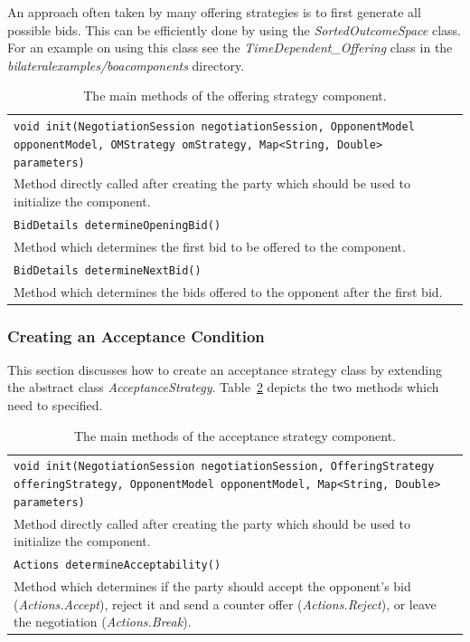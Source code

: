 \documentclass[]{article}
\begin{document}
An approach often taken by many offering strategies is to first generate all possible bids. This can be efficiently done by using the \textit{SortedOutcomeSpace} class. For an example on using this class see the \textit{TimeDependent\_Offering} class in the \textit{bilateralexamples/boacomponents} directory.

\begin{table}[h]
\begin{tabular}{m{}}
\hline
\texttt{void init(NegotiationSession negotiationSession, OpponentModel opponentModel, 
	OMStrategy omStrategy, Map<String, Double> parameters)}\\
Method directly called after creating the party which should be used to initialize the component.\\
\hline
\texttt{BidDetails determineOpeningBid()}\\
Method which determines the first bid to be offered to the component.\\
\hline
\texttt{BidDetails determineNextBid()}\\
Method which determines the bids offered to the opponent after the first bid.\\
\hline
\end{tabular}
\caption{The main methods of the offering strategy component.}
\label{tab:BOAbs}
\end{table}


\subsubsection{Creating an Acceptance Condition}
This section discusses how to create an acceptance strategy class by extending the abstract class \textit{AcceptanceStrategy}. Table~\ref{tab:BOAas} depicts the two methods which need to specified.

\begin{table}[h]
\begin{tabular}{m{}}
\hline
\texttt{void init(NegotiationSession negotiationSession, OfferingStrategy offeringStrategy,
			OpponentModel opponentModel, Map<String, Double> parameters)}\\
Method directly called after creating the party which should be used to initialize the component.\\
\hline
\texttt{Actions determineAcceptability()}\\
Method which determines if the party should accept the opponent's bid (\textit{Actions.Accept}), reject it and send a counter offer (\textit{Actions.Reject}), or leave the negotiation (\textit{Actions.Break}).\\
\hline
\end{tabular}
\caption{The main methods of the acceptance strategy component.}
\label{tab:BOAas}
\end{table}
\end{document}
